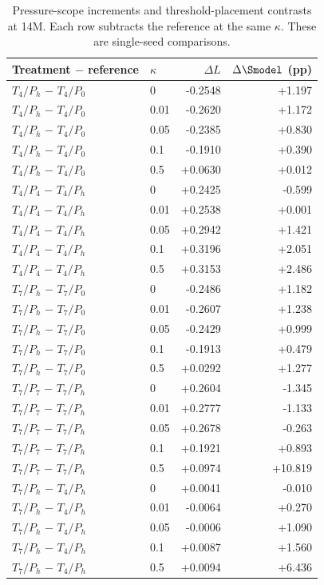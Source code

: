 \begin{table}[p]\centering\small
\caption{Pressure-scope increments and threshold-placement contrasts at 14M. Each row subtracts the reference at the same $\kappa$. These are single-seed comparisons.}\label{tab:pressure-scope-full}
\begin{tabular}{@{}llrr@{}}
\toprule
Treatment $-$ reference & $\kappa$ & $\Delta L$ & $\Delta\Smodel$ (pp) \\
\midrule
$T_4/P_h$ $-$ $T_4/P_0$ & 0 & -0.2548 & +1.197 \\
$T_4/P_h$ $-$ $T_4/P_0$ & 0.01 & -0.2620 & +1.172 \\
$T_4/P_h$ $-$ $T_4/P_0$ & 0.05 & -0.2385 & +0.830 \\
$T_4/P_h$ $-$ $T_4/P_0$ & 0.1 & -0.1910 & +0.390 \\
$T_4/P_h$ $-$ $T_4/P_0$ & 0.5 & +0.0630 & +0.012 \\
$T_4/P_4$ $-$ $T_4/P_h$ & 0 & +0.2425 & -0.599 \\
$T_4/P_4$ $-$ $T_4/P_h$ & 0.01 & +0.2538 & +0.001 \\
$T_4/P_4$ $-$ $T_4/P_h$ & 0.05 & +0.2942 & +1.421 \\
$T_4/P_4$ $-$ $T_4/P_h$ & 0.1 & +0.3196 & +2.051 \\
$T_4/P_4$ $-$ $T_4/P_h$ & 0.5 & +0.3153 & +2.486 \\
$T_7/P_h$ $-$ $T_7/P_0$ & 0 & -0.2486 & +1.182 \\
$T_7/P_h$ $-$ $T_7/P_0$ & 0.01 & -0.2607 & +1.238 \\
$T_7/P_h$ $-$ $T_7/P_0$ & 0.05 & -0.2429 & +0.999 \\
$T_7/P_h$ $-$ $T_7/P_0$ & 0.1 & -0.1913 & +0.479 \\
$T_7/P_h$ $-$ $T_7/P_0$ & 0.5 & +0.0292 & +1.277 \\
$T_7/P_7$ $-$ $T_7/P_h$ & 0 & +0.2604 & -1.345 \\
$T_7/P_7$ $-$ $T_7/P_h$ & 0.01 & +0.2777 & -1.133 \\
$T_7/P_7$ $-$ $T_7/P_h$ & 0.05 & +0.2678 & -0.263 \\
$T_7/P_7$ $-$ $T_7/P_h$ & 0.1 & +0.1921 & +0.893 \\
$T_7/P_7$ $-$ $T_7/P_h$ & 0.5 & +0.0974 & +10.819 \\
$T_7/P_h$ $-$ $T_4/P_h$ & 0 & +0.0041 & -0.010 \\
$T_7/P_h$ $-$ $T_4/P_h$ & 0.01 & -0.0064 & +0.270 \\
$T_7/P_h$ $-$ $T_4/P_h$ & 0.05 & -0.0006 & +1.090 \\
$T_7/P_h$ $-$ $T_4/P_h$ & 0.1 & +0.0087 & +1.560 \\
$T_7/P_h$ $-$ $T_4/P_h$ & 0.5 & +0.0094 & +6.436 \\
\bottomrule
\end{tabular}
\end{table}

